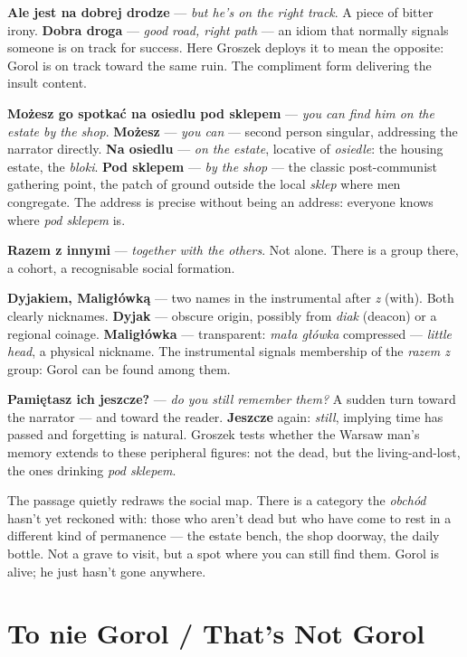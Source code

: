 \textbf{Ale jest na dobrej drodze} --- \textit{but he's on the
right track}. A piece of bitter irony. \textbf{Dobra droga} ---
\textit{good road, right path} --- an idiom that normally signals
someone is on track for success. Here Groszek deploys it to mean
the opposite: Gorol is on track toward the same ruin. The
compliment form delivering the insult content.

\textbf{Możesz go spotkać na osiedlu pod sklepem} --- \textit{you
can find him on the estate by the shop}. \textbf{Możesz} ---
\textit{you can} --- second person singular, addressing the
narrator directly. \textbf{Na osiedlu} --- \textit{on the
estate}, locative of \textit{osiedle}: the housing estate, the
\textit{bloki}. \textbf{Pod sklepem} --- \textit{by the shop}
--- the classic post-communist gathering point, the patch of
ground outside the local \textit{sklep} where men congregate.
The address is precise without being an address: everyone knows
where \textit{pod sklepem} is.

\textbf{Razem z innymi} --- \textit{together with the others}.
Not alone. There is a group there, a cohort, a recognisable
social formation.

\textbf{Dyjakiem, Maligłówką} --- two names in the instrumental
after \textit{z} (with). Both clearly nicknames.
\textbf{Dyjak} --- obscure origin, possibly from \textit{diak}
(deacon) or a regional coinage. \textbf{Maligłówka} ---
transparent: \textit{mała główka} compressed --- \textit{little
head}, a physical nickname. The instrumental signals membership
of the \textit{razem z} group: Gorol can be found among them.

\textbf{Pamiętasz ich jeszcze?} --- \textit{do you still
remember them?} A sudden turn toward the narrator --- and toward
the reader. \textbf{Jeszcze} again: \textit{still}, implying
time has passed and forgetting is natural. Groszek tests whether
the Warsaw man's memory extends to these peripheral figures: not
the dead, but the living-and-lost, the ones drinking
\textit{pod sklepem}.

\medskip
The passage quietly redraws the social map. There is a category
the \textit{obchód} hasn't yet reckoned with: those who aren't
dead but who have come to rest in a different kind of permanence
--- the estate bench, the shop doorway, the daily bottle. Not a
grave to visit, but a spot where you can still find them. Gorol
is alive; he just hasn't gone anywhere.

\section{To nie Gorol / That's Not Gorol}

